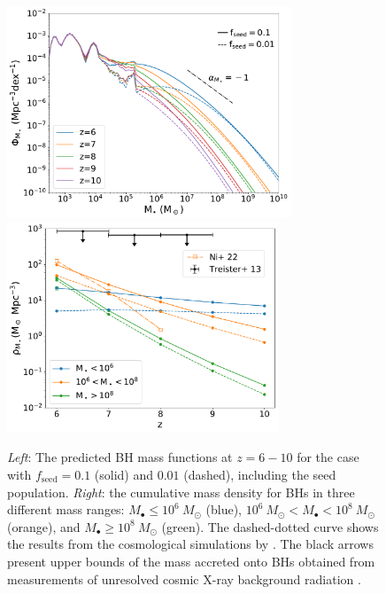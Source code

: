 \documentclass[twocolumn, twocolappendix]{aastex63}
\newcommand{\Msun}{M_\odot}
\newcommand{\fseed}{f_\mathrm{seed}}
\begin{document}
\begin{CJK*}{UTF8}{gbsn}
\begin{figure}
\centering
\includegraphics[width=85mm]{MF.pdf}\hspace{5mm}
\includegraphics[width=81mm]{rhoM_comb.pdf}
\caption{
{\it Left}: The predicted BH mass functions at $z=6-10$ for the case with $\fseed=0.1$ (solid) and $0.01$ (dashed), including the seed population.
{\it Right}: the cumulative mass density for BHs in three different mass ranges: $M_\bullet \leq 10^6~\Msun$ (blue), $10^6~\Msun < M_\bullet < 10^8~\Msun$ (orange),
and $M_\bullet \geq 10^8~\Msun$ (green).
The dashed-dotted curve shows the results from the cosmological simulations by \citet{2022MNRAS.513..670N}.
The black arrows present upper bounds of the mass accreted onto BHs obtained from measurements of unresolved cosmic X-ray background radiation \citep{2013ApJ...778..130T}.
}
\label{fig:BHMF_rhoz}
\vspace{5mm}
\end{figure}



\end{CJK*}
\end{document}

